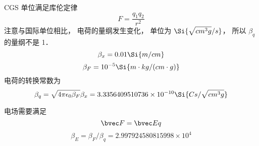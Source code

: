 
\begin{issues}
\issueDraft
\end{issues}


CGS 单位满足库伦定律
\begin{equation}
F = \frac{q_1 q_2}{r^2}
\end{equation}
注意与国际单位相比， 电荷的量纲发生变化， 单位为 $\Si{\sqrt{cm^3 g}/s}$， 所以 $\beta_q$ 的量纲不是 1．
\begin{equation}
\beta_x = 0.01 \Si{m/cm}
\end{equation}
\begin{equation}
\beta_F = 10^{-5} \Si{m\cdot kg/(cm\cdot g)}
\end{equation}
电荷的转换常数为
\begin{equation}
\beta_q = \sqrt{4\pi\epsilon_0\beta_F} \beta_x = 3.3356409510736\times 10^{-10} \Si{Cs/\sqrt{cm^3 g}}
\end{equation}

电场需要满足
\begin{equation}
\bvec F = \bvec E q
\end{equation}
\begin{equation}
\beta_E = \beta_F/\beta_q = 2.997924580815998\times 10^4
\end{equation}
